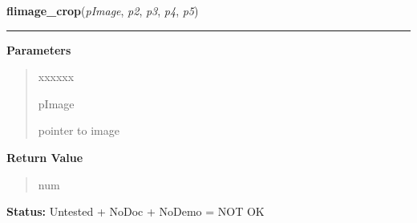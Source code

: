 \hspace{.8\funcindent}\begin{boxedminipage}{\funcwidth}

    \raggedright \textbf{flimage\_crop}(\textit{pImage}, \textit{p2}, \textit{p3}, \textit{p4}, \textit{p5})

    \vspace{-1.5ex}

    \rule{\textwidth}{0.5\fboxrule}
\setlength{\parskip}{2ex}
\setlength{\parskip}{1ex}
      \textbf{Parameters}
      \vspace{-1ex}

      \begin{quote}
        \begin{Ventry}{xxxxxx}

          \item[pImage]

          pointer to image

        \end{Ventry}

      \end{quote}

      \textbf{Return Value}
    \vspace{-1ex}

      \begin{quote}
      num

      \end{quote}

\textbf{Status:} Untested + NoDoc + NoDemo = NOT OK



    \end{boxedminipage}

    \label{xformslib:library:flimage_replace_pixel}

    \vspace{0.5ex}

